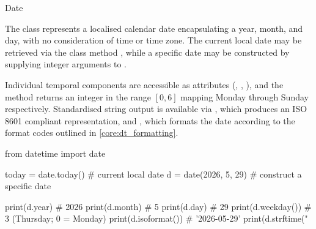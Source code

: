 \documentclass[10pt]{article}
\begin{document}
    \begin{core}{Date}

      The  class represents a localised calendar date encapsulating a year, month, and day, with no consideration of time or time zone. The current local date may be retrieved via the class method , while a specific date may be constructed by supplying integer arguments to .

      Individual temporal components are accessible as attributes (, , ), and the  method returns an integer in the range $[0, 6]$ mapping Monday through Sunday respectively. Standardised string output is available via , which produces an ISO 8601 compliant representation, and , which formats the date according to the format codes outlined in \autoref{core:dt_formatting}.

      \begin{pyconsole}

        from datetime import date

        today = date.today()          # current local date
        d = date(2026, 5, 29)         # construct a specific date

        print(d.year)                 # 2026
        print(d.month)                # 5
        print(d.day)                  # 29
        print(d.weekday())            # 3 (Thursday; 0 = Monday)
        print(d.isoformat())          # '2026-05-29'
        print(d.strftime("%

      \end{pyconsole}

    \end{core}
\end{document}

